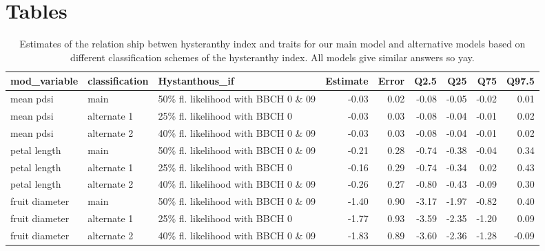 \documentclass{article}[11pt]
\begin{document}
\section*{Tables}
\begin{table}[ht]
\centering
\begin{tabular}[width=.8\textwidth]{|lllrrrrrr|}
  \hline
  mod\_variable & classification & Hystanthous\_if & Estimate & Error & Q2.5 & Q25 & Q75 & Q97.5 \\ 
  \hline
 mean pdsi & main & 50\% fl. likelihood with BBCH 0 \& 09 & -0.03 & 0.02 & -0.08 & -0.05 & -0.02 & 0.01 \\ 
   mean pdsi & alternate 1 & 25\% fl. likelihood with BBCH 0 & -0.03 & 0.03 & -0.08 & -0.04 & -0.01 & 0.02 \\ 
  mean pdsi & alternate 2 & 40\% fl. likelihood with BBCH 0 \& 09 & -0.03 & 0.03 & -0.08 & -0.04 & -0.01 & 0.02 \\ 
  \hline
   petal length & main & 50\% fl. likelihood  with BBCH 0 \& 09 & -0.21 & 0.28 & -0.74 & -0.38 & -0.04 & 0.34 \\ 
  petal length & alternate 1 & 25\% fl. likelihood with BBCH 0 & -0.16 & 0.29 & -0.74 & -0.34 & 0.02 & 0.43 \\ 
  petal length & alternate 2 & 40\% fl. likelihood with BBCH 0 \& 09 & -0.26 & 0.27 & -0.80 & -0.43 & -0.09 & 0.30 \\ 
 \hline
 fruit diameter & main & 50\% fl. likelihood  with BBCH 0 \& 09 & -1.40 & 0.90 & -3.17 & -1.97 & -0.82 & 0.40 \\ 
  fruit diameter & alternate 1 & 25\% fl. likelihood with BBCH 0 & -1.77 & 0.93 & -3.59 & -2.35 & -1.20 & 0.09 \\ 
  fruit diameter & alternate 2 & 40\% fl. likelihood with BBCH 0 \& 09 & -1.83 & 0.89 & -3.60 & -2.36 & -1.28 & -0.09 \\ 
   \hline
\end{tabular}
\caption{Estimates of the relation ship betwen hysteranthy index and traits for our main model and alternative models based on different classification schemes of the hysteranthy index. All models give similar answers so yay.}
\label{tab:modput}
\end{table}
\end{document}

